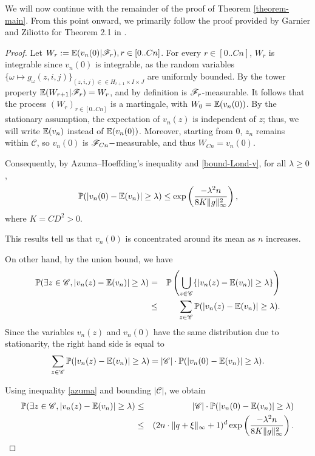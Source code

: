 	We will now continue with the remainder of the proof of Theorem \ref{theorem-main}. From this point onward, we primarily follow the proof provided by Garnier and Ziliotto for Theorem 2.1 in \cite{GarnierZiliotto2022}.

	\begin{proof}
		Let $W_r := \mathbb{E}(v_n(0)|\mathscr{F}_r), r\in [0..Cn]$. For every $r\in [0..Cn]$, $W_r$ is integrable since $v_n(0)$ is integrable, as the random variables $\{\omega \mapsto g_{\omega}(z, i, j)\}_{(z, i, j) \in \in H_{r+1} \times I \times J}$ are uniformly bounded. By the tower property $\mathbb{E}(W_{r+1}|\mathscr{F}_r) = W_r$, and by definition is $\mathscr{F}_r$-measurable. It follows that the process $(W_r)_{r \in [0..Cn]}$ is a martingale, with $W_0 = \mathbb{E}(v_n(0))$. By the stationary assumption, the expectation of $v_n(z)$ is independent of $z$; thus, we will write $\mathbb{E}(v_n)$ instead of $\mathbb{E}(v_n(0))$. Moreover, starting from 0, $z_n$ remains within $\mathscr{C}$, so $v_n(0)$ is $\mathscr{F}_{Cn}-$measurable, and thus $W_{Cn} = v_n(0)$. 

		Consequently, by Azuma–Hoeffding's inequality and \eqref{bound-Lond-v}, for all $\lambda \geq 0$,
		\begin{equation}\label{azuma}
			\mathbb{P}(|v_n(0) - \mathbb{E}(v_n)| \geq \lambda) \leq \exp\left(\frac{-\lambda^2n}{8K\|g\|_{\infty}^2}\right),
		\end{equation}
	where $K = CD^2 > 0$.

	This results tell us that $v_n(0)$ is concentrated around its mean as $n$ increases.
		
	On other hand, by the union bound, we have
	\begin{eqnarray*}
		\mathbb{P}(\exists z \in \mathscr{C}, |v_n(z) - \mathbb{E}(v_n)| \geq \lambda) & = & \mathbb{P}\left(\bigcup_{z\in \mathscr{C}}\{|v_n(z) - \mathbb{E}(v_n)| \geq \lambda\}\right) \\
		 & \leq & \sum_{z\in \mathscr{C}}\mathbb{P}(|v_n(z) - \mathbb{E}(v_n)| \geq \lambda).
	\end{eqnarray*}
	Since the variables $v_n(z)$ and $v_n(0)$ have the same distribution due to stationarity, the right hand side is equal to
	\[
		\sum_{z\in \mathscr{C}}\mathbb{P}(|v_n(z) - \mathbb{E}(v_n)| \geq \lambda) = |\mathscr{C}| \cdot \mathbb{P}(|v_n(0) - \mathbb{E}(v_n)| \geq \lambda). 
	\]
	
	Using inequality \eqref{azuma} and bounding $|\mathcal{C}|$, we obtain
	\begin{eqnarray*}
		\mathbb{P}(\exists z \in \mathscr{C}, |v_n(z) - \mathbb{E}(v_n)| \geq \lambda) & \leq & |\mathscr{C}| \cdot \mathbb{P}(|v_n(0) - \mathbb{E}(v_n)| \geq \lambda) \\
		 & \leq & (2n \cdot \|q + \xi \|_{\infty} + 1)^d \exp\left(\frac{-\lambda^2n}{8K\|g\|_{\infty}^2}\right).
	\end{eqnarray*}
 

\end{proof}
